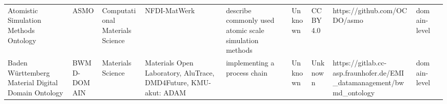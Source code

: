 \begin{tabular}{llllllllll}
                                            Atomistic Simulation Methods Ontology &                    ASMO &             Computational Materials Science &                                                                                                                                                                                                                                                                                                                                                         NFDI-MatWerk &                                                                                                                                                                                                                                                                                                                                                 describe commonly used atomic scale simulation methods &                                                                                                            Unknown &                                    CC BY 4.0 &                                                                       https://github.com/OCDO/asmo &      domain-level \\
                               Baden Württemberg Material Digital Domain Ontology &             BWMD-DOMAIN &                           Materials Science &                                                                                                                                                                                                                                                                                                      Materials Open Laboratory, AluTrace, DMD4Future, KMU-akut: ADAM &                                                                                                                                                                                                                                                                                                                                                                           implementing a process chain &                                                                                                            Unknown &                                      Unknown &                               https://gitlab.cc-asp.fraunhofer.de/EMI_datamanagement/bwmd_ontology &      domain-level \\

\end{tabular}
